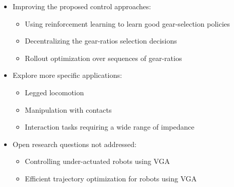 \begin{itemize}
		\item Improving the proposed control approaches:
		\begin{itemize}
			\item Using reinforcement learning to learn good gear-selection policies
			\item Decentralizing the gear-ratios selection decisions
			\item Rollout optimization over sequences of gear-ratios
		\end{itemize}
		\item Explore more specific applications:
		\begin{itemize}
			\item Legged locomotion
			\item Manipulation with contacts
			\item Interaction tasks requiring a wide range of impedance
		\end{itemize}
		\item Open research questions not addressed:
		\begin{itemize}
			\item Controlling under-actuated robots using VGA
			\item Efficient trajectory optimization for robots using VGA
		\end{itemize}
\end{itemize}